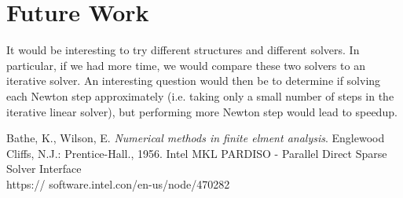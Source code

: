\documentclass[11pt]{article}
\begin{document}
\section{Future Work}\label{sec:future}
It would be interesting to try different structures and different solvers. In particular, if we had more time, we would compare these two solvers to an iterative solver. An interesting question would then be to determine if solving each Newton step approximately (i.e. taking only a small number of steps in the iterative linear solver), but performing more Newton step would lead to speedup. 

\begin{thebibliography}{2}
	 Bathe, K., Wilson, E. \emph{Numerical methods in finite elment analysis}. Englewood Cliffs, N.J.: Prentice-Hall., 1956.
	 Intel MKL PARDISO - Parallel Direct Sparse Solver Interface\\
	 https:// software.intel.con/en-us/node/470282
\end{thebibliography}
\end{document}
